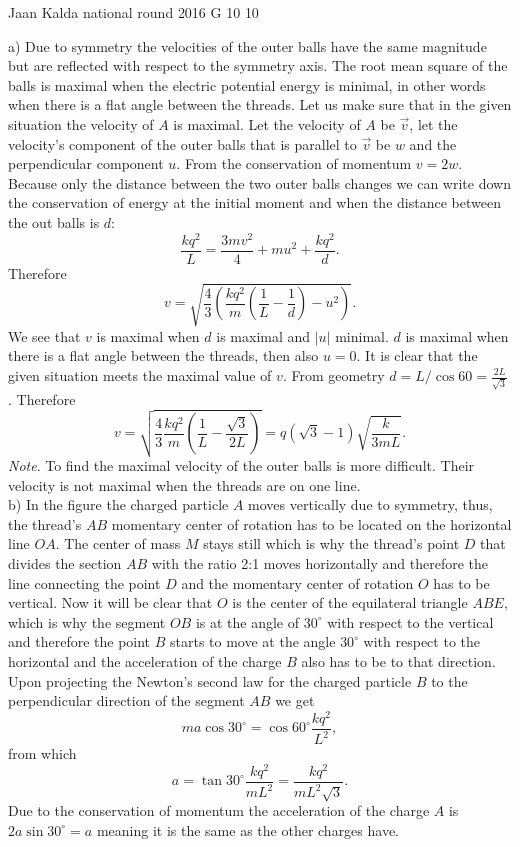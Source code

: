 \documentclass[11pt]{article}
\begin{document}
{Jaan Kalda} %
{national round} %
{2016} %
{G 10} %
{10} %
{

\ifEngSolution
a) Due to symmetry the velocities of the outer balls have the same magnitude but are reflected with respect to the symmetry axis. The root mean square of the balls is maximal when the electric potential energy is minimal, in other words when there is a flat angle between the threads. Let us make sure that in the given situation the velocity of $A$ is maximal. Let the velocity of $A$ be $\vec v$, let the velocity’s component of the outer balls that is parallel to $\vec v$ be $w$ and the perpendicular component $u$. From the conservation of momentum $v = 2w$. Because only the distance between the two outer balls changes we can write down the conservation of energy at the initial moment and when the distance between the out balls is $d$:
\[
\frac{kq^2}{L} = \frac{3mv^2}{4} + mu^2 + \frac{kq^2}{d}.
\] 
Therefore
\[
v = \sqrt{\frac{4}{3}\left(\frac{kq^2}{m}\left(\frac{1}{L} - \frac{1}{d}\right) - u^2\right)}.
\] 
We see that $v$ is maximal when $d$ is maximal and $|u|$ minimal. $d$ is maximal when there is a flat angle between the threads, then also $u = 0$. It is clear that the given situation meets the maximal value of $v$. From geometry $d = L/\cos 60 = \frac{2L}{\sqrt 3}$. Therefore
\[
v = \sqrt{\frac{4}{3}\frac{kq^2}{m}\left(\frac{1}{L}-\frac{\sqrt{3}}{2L}\right)} = q\left(\sqrt{3} - 1\right)\sqrt{\frac{k}{3mL}}.
\] 
\emph{Note}. To find the maximal velocity of the outer balls is more difficult. Their velocity is not maximal when the threads are on one line.\\
b) In the figure the charged particle $A$ moves vertically due to symmetry, thus, the thread’s $AB$ momentary center of rotation has to be located on the horizontal line $OA$. The center of mass $M$ stays still which is why the thread’s point $D$ that divides the section $AB$ with the ratio 2:1 moves horizontally and therefore the line connecting the point $D$ and the momentary center of rotation $O$ has to be vertical. Now it will be clear that $O$ is the center of the equilateral triangle $ABE$, which is why the segment $OB$ is at the angle of $30^\circ$ with respect to the vertical and therefore the point $B$ starts to move at the angle $30^\circ$ with respect to the horizontal and the acceleration of the charge $B$ also has to be to that direction. Upon projecting the Newton’s second law for the charged particle $B$ to the perpendicular direction of the segment $AB$ we get
$$ma\cos 30^\circ=\cos 60^\circ  \frac{kq^2}{L^2},$$ 
from which 
$$a=\tan 30^\circ \frac{kq^2}{mL^2}=\frac{kq^2}{mL^2\sqrt 3}.$$ 
Due to the conservation of momentum the acceleration of the charge $A$ is $2a\sin30^\circ=a$ meaning it is the same as the other charges have.
\fi
}
\end{document}

